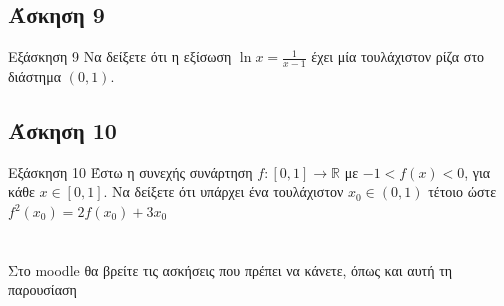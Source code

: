 \documentclass[greek]{beamer}
\begin{document}
\subsection{Άσκηση 9}
\begin{frame}[label=Άσκηση9]{Εξάσκηση 9}
    Να δείξετε ότι η εξίσωση $\ln x=\frac{1}{x-1}$ έχει μία τουλάχιστον ρίζα στο διάστημα $(0,1)$.


\end{frame}

\subsection{Άσκηση 10}
\begin{frame}[label=Άσκηση10]{Εξάσκηση 10}
    Έστω η συνεχής συνάρτηση $f:[0,1]\to\mathbb{R}$ με $-1<f(x)<0$, για κάθε $x\in [0,1]$. Να δείξετε ότι υπάρχει ένα τουλάχιστον $x_0\in (0,1)$ τέτοιο ώστε $f^2(x_0)=2f(x_0)+3x_0$

\end{frame}

\section{}
\begin{frame}
    Στο moodle θα βρείτε τις ασκήσεις που πρέπει να κάνετε, όπως και αυτή τη παρουσίαση
\end{frame}
\end{document}
